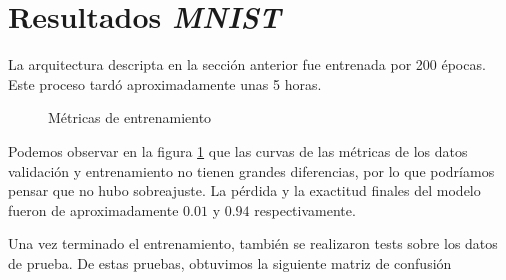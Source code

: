 \documentclass [a4paper,12pt,oneside,final]{article}
\begin{document}
\section{Resultados {\it MNIST}}

La arquitectura descripta en la sección anterior fue entrenada por 200 épocas. Este proceso tardó aproximadamente unas 5 horas.

\begin{figure}%
    \centering
    \qquad
    \caption{Métricas de entrenamiento}\label{fig:mnist_metrics}
\end{figure}

Podemos observar en la figura \ref{fig:mnist_metrics} que las curvas de las métricas de los datos validación y entrenamiento no tienen grandes diferencias, por lo que podríamos pensar que no hubo sobreajuste. La pérdida y la exactitud finales del modelo fueron de aproximadamente $0.01$ y $0.94$ respectivamente.

Una vez terminado el entrenamiento, también se realizaron tests sobre los datos de prueba. De estas pruebas, obtuvimos la siguiente matriz de confusión 
\end{document}
